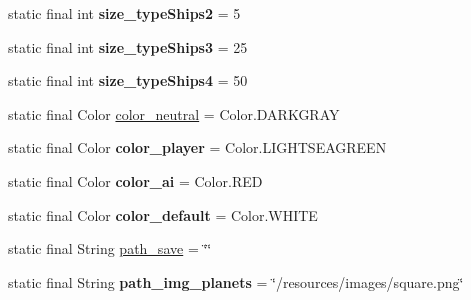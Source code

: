 \begin{DoxyCompactItemize}
static final int {\bfseries size\+\_\+type\+Ships2} = 5
\item 
\mbox{\label{classfr_1_1groupe40_1_1projet_1_1util_1_1_Constants_a8a1165315455a43e2bb104a062fb5943}} 
static final int {\bfseries size\+\_\+type\+Ships3} = 25
\item 
\mbox{\label{classfr_1_1groupe40_1_1projet_1_1util_1_1_Constants_ab3eb4d8a8fcd19d792f7e7d93c650746}} 
static final int {\bfseries size\+\_\+type\+Ships4} = 50
\item 
static final Color \mbox{\hyperlink{classfr_1_1groupe40_1_1projet_1_1util_1_1_Constants_ab371ca0a12a467e674717725bf528c80}{color\+\_\+neutral}} = Color.\+D\+A\+R\+K\+G\+R\+AY
\item 
\mbox{\label{classfr_1_1groupe40_1_1projet_1_1util_1_1_Constants_a203dab4561bb9bd05828a81f1bfa61b5}} 
static final Color {\bfseries color\+\_\+player} = Color.\+L\+I\+G\+H\+T\+S\+E\+A\+G\+R\+E\+EN
\item 
\mbox{\label{classfr_1_1groupe40_1_1projet_1_1util_1_1_Constants_ab926a9ffae54037d9d5666cf53a913ef}} 
static final Color {\bfseries color\+\_\+ai} = Color.\+R\+ED
\item 
\mbox{\label{classfr_1_1groupe40_1_1projet_1_1util_1_1_Constants_abce28375ccffaf58e7eb520bdff56f08}} 
static final Color {\bfseries color\+\_\+default} = Color.\+W\+H\+I\+TE
\item 
static final String \mbox{\hyperlink{classfr_1_1groupe40_1_1projet_1_1util_1_1_Constants_a594d78730a1028de3d6e5f757fb48d89}{path\+\_\+save}} = \char`\"{}\char`\"{}
\item 
\mbox{\label{classfr_1_1groupe40_1_1projet_1_1util_1_1_Constants_a11fde697725ee4aa2333f7423cf60863}} 
static final String {\bfseries path\+\_\+img\+\_\+planets} = \char`\"{}/resources/images/square.\+png\char`\"{}
\item 
\mbox{\label{classfr_1_1groupe40_1_1projet_1_1util_1_1_Constants_a108da68ced1e893fdd226931dcf1d663}} 

\end{DoxyCompactItemize}
